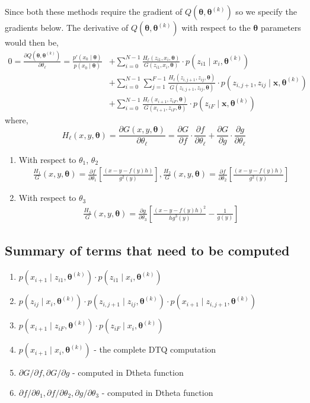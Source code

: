 \documentclass[12pt]{article}
\newcommand{\bx}{\ensuremath{\mathbf{x}}}
\newcommand{\btheta}{\ensuremath{\boldsymbol{\theta}}}
\begin{document}
Since both these methods require the gradient of $Q(\btheta, \btheta^{(k)})$ so we specify the gradients below. The derivative of $Q(\btheta, \btheta^{(k)})$ with respect to the $\btheta$ parameters would then be,
\begin{align*}
0 = \frac{\partial Q(\btheta, \btheta^{(k)})}{\partial \theta_{\ell}} = \frac{p'(x_0 \mid \btheta)}{p(x_0 \mid \btheta)} & + \sum_{i=0}^{N-1} \frac{H_{\ell}(z_{i1}, x_i, \btheta)}{G(z_{i1}, x_i, \btheta)} \cdot p(z_{i1} \mid x_i, \btheta^{(k)}) \\
& + \sum_{i=0}^{N-1} \sum_{j=1}^{F-1} \frac{H_{\ell}(z_{i,j+1}, z_{ij}, \btheta)}{G(z_{i,j+1}, z_{ij}, \btheta)} \cdot p(z_{i,j+1}, z_{ij} \mid \bx, \btheta^{(k)}) \nonumber \\
& + \sum_{i=0}^{N-1} \frac{H_{\ell}(x_{i+1}, z_{iF}, \btheta)}{G(x_{i+1}, z_{iF}, \btheta)} \cdot p(z_{iF} \mid \bx, \btheta^{(k)})
\end{align*}
where, $$H_{\ell}(x,y,\btheta) = \frac{\partial G(x,y,\btheta)}{\partial \theta_{\ell}} = \frac{\partial G}{\partial f}\cdot \frac{\partial f}{\partial \theta_{\ell}} + \frac{\partial G}{\partial g} \cdot \frac{\partial g}{\partial \theta_{\ell}} $$
\begin{enumerate}
\item With respect to $\theta_1$, $\theta_2$
\begin{align*}
\frac{H_{1}}{G}(x,y,\btheta) = \frac{\partial f}{\partial \theta_1} \left[ \frac{(x - y - f(y)h)}{g^2(y)} \right], \frac{H_{2}}{G}(x,y,\btheta) = \frac{\partial f}{\partial \theta_2} \left[ \frac{(x - y - f(y)h)}{g^2(y)} \right]
\end{align*}
\item With respect to $\theta_3$
\begin{align*}
\frac{H_{3}}{G}(x,y,\btheta) = \frac{\partial g}{\partial \theta_3} \left[ \frac{(x - y - f(y)h)^2}{h g^3(y)} - \frac{1}{g(y)} \right]
\end{align*}
\end{enumerate}

\subsection{Summary of terms that need to be computed}
\begin{enumerate}
\item $p(x_{i+1} \mid z_{i1}, \btheta^{(k)}) \cdot p(z_{i1} \mid x_{i}, \btheta^{(k)})$
\item $p(z_{ij} \mid x_i, \btheta^{(k)}) \cdot p(z_{i, j+1} \mid z_{ij}, \btheta^{(k)}) \cdot p(x_{i+1} \mid z_{i,j+1}, \btheta^{(k)})$
\item $p(x_{i+1} \mid z_{iF}, \btheta^{(k)}) \cdot p(z_{iF} \mid x_{i}, \btheta^{(k)})$
\item $p(x_{i+1} \mid x_{i}, \btheta^{(k)})$ - the complete DTQ computation
\item $\partial G/\partial f, \partial G/\partial g$ - computed in Dtheta function
\item $\partial f/\partial \theta_1, \partial f/\partial \theta_2, \partial g/\partial \theta_3$ - computed in Dtheta function
\end{enumerate}
\end{document}
